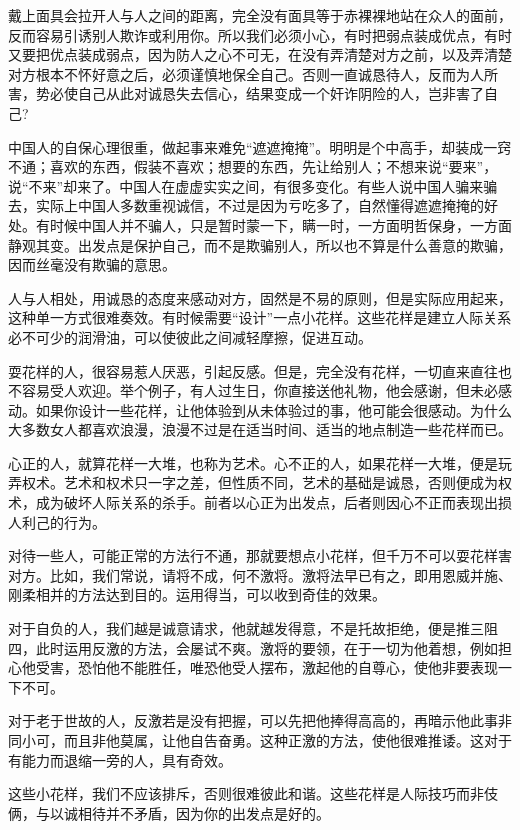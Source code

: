 \documentclass[fontset=fandol, a4paper, 12pt, openright]{ctexbook}
\begin{document}
戴上面具会拉开人与人之间的距离，完全没有面具等于赤裸裸地站在众人的面前，反而容易引诱别人欺诈或利用你。所以我们必须小心，有时把弱点装成优点，有时又要把优点装成弱点，因为防人之心不可无，在没有弄清楚对方之前，以及弄清楚对方根本不怀好意之后，必须谨慎地保全自己。否则一直诚恳待人，反而为人所害，势必使自己从此对诚恳失去信心，结果变成一个奸诈阴险的人，岂非害了自己?

中国人的自保心理很重，做起事来难免“遮遮掩掩”。明明是个中高手，却装成一窍不通；喜欢的东西，假装不喜欢；想要的东西，先让给别人；不想来说“要来”，说“不来”却来了。中国人在虚虚实实之间，有很多变化。有些人说中国人骗来骗去，实际上中国人多数重视诚信，不过是因为亏吃多了，自然懂得遮遮掩掩的好处。有时候中国人并不骗人，只是暂时蒙一下，瞒一时，一方面明哲保身，一方面静观其变。出发点是保护自己，而不是欺骗别人，所以也不算是什么善意的欺骗，因而丝毫没有欺骗的意思。

人与人相处，用诚恳的态度来感动对方，固然是不易的原则，但是实际应用起来，这种单一方式很难奏效。有时候需要“设计”一点小花样。这些花样是建立人际关系必不可少的润滑油，可以使彼此之间减轻摩擦，促进互动。

耍花样的人，很容易惹人厌恶，引起反感。但是，完全没有花样，一切直来直往也不容易受人欢迎。举个例子，有人过生日，你直接送他礼物，他会感谢，但未必感动。如果你设计一些花样，让他体验到从未体验过的事，他可能会很感动。为什么大多数女人都喜欢浪漫，浪漫不过是在适当时间、适当的地点制造一些花样而已。

心正的人，就算花样一大堆，也称为艺术。心不正的人，如果花样一大堆，便是玩弄权术。艺术和权术只一字之差，但性质不同，艺术的基础是诚恳，否则便成为权术，成为破坏人际关系的杀手。前者以心正为出发点，后者则因心不正而表现出损人利己的行为。

对待一些人，可能正常的方法行不通，那就要想点小花样，但千万不可以耍花样害对方。比如，我们常说，请将不成，何不激将。激将法早已有之，即用恩威并施、刚柔相并的方法达到目的。运用得当，可以收到奇佳的效果。

对于自负的人，我们越是诚意请求，他就越发得意，不是托故拒绝，便是推三阻四，此时运用反激的方法，会屡试不爽。激将的要领，在于一切为他着想，例如担心他受害，恐怕他不能胜任，唯恐他受人摆布，激起他的自尊心，使他非要表现一下不可。

对于老于世故的人，反激若是没有把握，可以先把他捧得高高的，再暗示他此事非同小可，而且非他莫属，让他自告奋勇。这种正激的方法，使他很难推诿。这对于有能力而退缩一旁的人，具有奇效。

这些小花样，我们不应该排斥，否则很难彼此和谐。这些花样是人际技巧而非伎俩，与以诚相待并不矛盾，因为你的出发点是好的。
\end{document}
